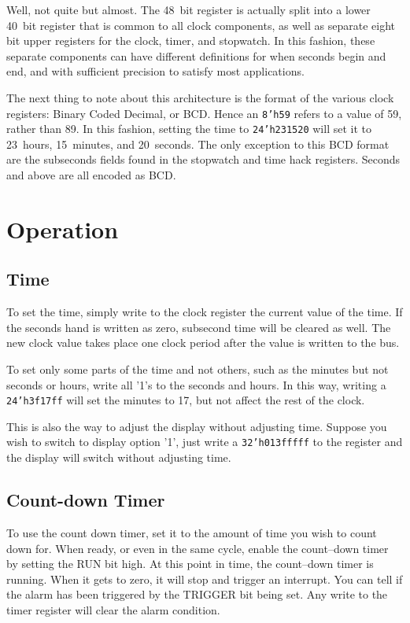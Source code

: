 \documentclass{gqtekspec}
\begin{document}
Well, not quite but almost.  The 48~bit register is actually split into a
lower 40~bit register that is common to all clock components, as well as
separate eight bit upper registers for the clock, timer, and stopwatch.  In
this fashion, these separate components can have different definitions for
when seconds begin and end, and with sufficient precision to satisfy most
applications.

The next thing to note about this architecture is the format of the various
clock registers: Binary Coded Decimal, or BCD.  Hence an {\tt 8'h59} refers
to a value of 59, rather than 89.  In this fashion, setting the time to
{\tt 24'h231520} will set it to 23~hours, 15~minutes, and 20~seconds.  The
only exception to this BCD format are the subseconds fields found in the
stopwatch and time hack registers.  Seconds and above are all encoded as BCD.

\chapter{Operation}\label{chap:ops}

\section{Time}
To set the time, simply write to the clock register the current value of the
time.  If the seconds hand is written as zero, subsecond time will be cleared
as well.  The new clock value takes place one clock period after the value
is written to the bus.

To set only some parts of the time and not others, such as the minutes but
not seconds or hours, write all '1's to the seconds and hours.  In this way,
writing a {\tt 24'h3f17ff} will set the minutes to 17, but not affect the
rest of the clock.

This is also the way to adjust the display without adjusting time.  Suppose
you wish to switch to display option '1', just write a {\tt 32'h013fffff} to
the register and the display will switch without adjusting time.

\section{Count-down Timer}
To use the count down timer, set it to the amount of time you wish to count
down for.  When ready, or even in the same cycle, enable the count--down
timer by setting the RUN bit high.  At this point in time, the count--down
timer is running.  When it gets to zero, it will stop and trigger an interrupt.
You can tell if the alarm has been triggered by the TRIGGER bit being set.
Any write to the timer register will clear the alarm condition.
\end{document}
